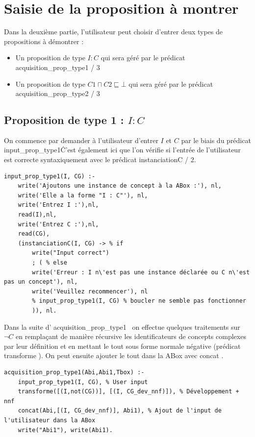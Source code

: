 \documentclass{article}
\begin{document}
\section{Saisie de la proposition à montrer}
Dans la deuxième partie, l'utilisateur peut choisir d'entrer deux types de propositions à démontrer : 
\begin{itemize}
    \item Un proposition de type $ I : C $ qui sera géré par le prédicat \color{blue}acquisition\_prop\_type1 / 3 \color{black}
    \item Un proposition de type $ C1 \sqcap C2 \sqsubseteq \bot  $ qui sera géré par le prédicat \color{blue}acquisition\_prop\_type2 / 3 \color{black}
\end{itemize}

\subsection{Proposition de type 1 : $ I : C $ }
On commence par demander à l'utilisateur d'entrer $ I $ et $ C $ par le biais du prédicat \color{blue}input\_prop\_type1\color{black}\. C'est également ici que l'on vérifie si l'entrée de l'utilisateur est correcte syntaxiquement avec le prédicat \color{blue}instanciationC / 2\color{black}.
\begin{verbatim}
input_prop_type1(I, CG) :-
    write('Ajoutons une instance de concept à la ABox :'), nl,
    write('Elle a la forme "I : C"'), nl,
    write('Entrez I :'),nl, 
    read(I),nl,
    write('Entrez C :'),nl, 
    read(CG),
    (instanciationC(I, CG) -> % if 
        write("Input correct")
        ; ( % else
        write('Erreur : I n\'est pas une instance déclarée ou C n\'est pas un concept'), nl,
        write('Veuillez recommencer'), nl
        % input_prop_type1(I, CG) % boucler ne semble pas fonctionner 
        )), nl.
\end{verbatim}
Dans la suite d'\color{blue} acquisition\_prop\_type1 \color{black}\ on effectue quelques traitements sur $ \neg C $ en remplaçant de manière récursive les identificateurs de concepts complexes par leur définition et en mettant le tout sous forme normale négative (prédicat \color{blue} transforme \color{black}). On peut ensuite ajouter le tout dans la ABox avec \color{blue} concat \color{black}.
\begin{verbatim}
acquisition_prop_type1(Abi,Abi1,Tbox) :- 
    input_prop_type1(I, CG), % User input
    transforme([(I,not(CG))], [(I, CG_dev_nnf)]), % Développement + nnf
    concat(Abi,[(I, CG_dev_nnf)], Abi1), % Ajout de l'input de l'utilisateur dans la ABox
    write("Abi1"), write(Abi1). 
\end{verbatim}
\end{document}
